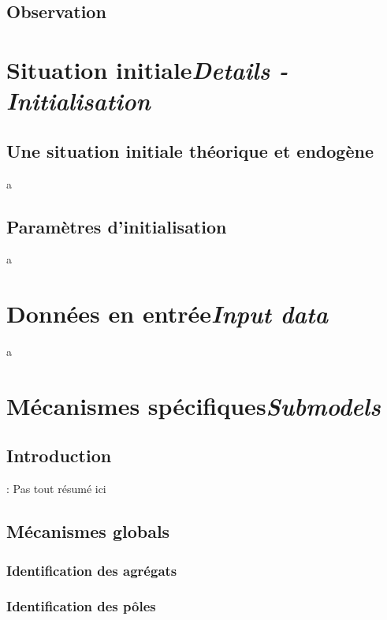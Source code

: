 \subsection*{Observation}


\section[Situation initiale -- \textit{Details - Initialisation}]{Situation initiale\protect\newline \large{\textit{Details - Initialisation}}  \label{sec:initialisation}}

\subsection{Une situation initiale théorique et endogène}
a
\subsection{Paramètres d'initialisation}
a
\section[Données en entrée -- \textit{Input data}]{Données en entrée\protect\newline \large{\textit{Input data}} }
a

\section[Mécanismes spécifiques -- \textit{Submodels}]{Mécanismes spécifiques\protect\newline \large{\textit{Submodels}}  \label{sec:meca-specifiques}}

\subsection{Introduction} : Pas tout résumé ici

\subsection{Mécanismes globals}
	\subsubsection{Identification des agrégats}
	\subsubsection{Identification des pôles}
